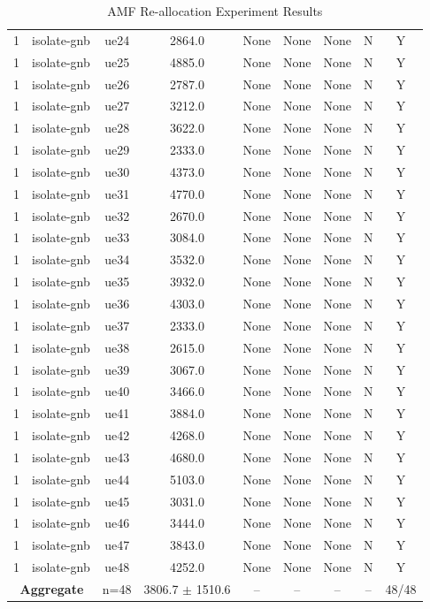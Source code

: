 \begin{table}[ht]
\begin{tabular}{|c|c|c|c|c|c|c|c|c|}
1 & isolate-gnb & ue24 & 2864.0 & None & None & None & N & Y \\
1 & isolate-gnb & ue25 & 4885.0 & None & None & None & N & Y \\
1 & isolate-gnb & ue26 & 2787.0 & None & None & None & N & Y \\
1 & isolate-gnb & ue27 & 3212.0 & None & None & None & N & Y \\
1 & isolate-gnb & ue28 & 3622.0 & None & None & None & N & Y \\
1 & isolate-gnb & ue29 & 2333.0 & None & None & None & N & Y \\
1 & isolate-gnb & ue30 & 4373.0 & None & None & None & N & Y \\
1 & isolate-gnb & ue31 & 4770.0 & None & None & None & N & Y \\
1 & isolate-gnb & ue32 & 2670.0 & None & None & None & N & Y \\
1 & isolate-gnb & ue33 & 3084.0 & None & None & None & N & Y \\
1 & isolate-gnb & ue34 & 3532.0 & None & None & None & N & Y \\
1 & isolate-gnb & ue35 & 3932.0 & None & None & None & N & Y \\
1 & isolate-gnb & ue36 & 4303.0 & None & None & None & N & Y \\
1 & isolate-gnb & ue37 & 2333.0 & None & None & None & N & Y \\
1 & isolate-gnb & ue38 & 2615.0 & None & None & None & N & Y \\
1 & isolate-gnb & ue39 & 3067.0 & None & None & None & N & Y \\
1 & isolate-gnb & ue40 & 3466.0 & None & None & None & N & Y \\
1 & isolate-gnb & ue41 & 3884.0 & None & None & None & N & Y \\
1 & isolate-gnb & ue42 & 4268.0 & None & None & None & N & Y \\
1 & isolate-gnb & ue43 & 4680.0 & None & None & None & N & Y \\
1 & isolate-gnb & ue44 & 5103.0 & None & None & None & N & Y \\
1 & isolate-gnb & ue45 & 3031.0 & None & None & None & N & Y \\
1 & isolate-gnb & ue46 & 3444.0 & None & None & None & N & Y \\
1 & isolate-gnb & ue47 & 3843.0 & None & None & None & N & Y \\
1 & isolate-gnb & ue48 & 4252.0 & None & None & None & N & Y \\
\multicolumn{2}{|c|}{\textbf{Aggregate}} & n=48 & 3806.7 $\pm$ 1510.6 & -- & -- & -- & -- & 48/48 \\
\hline
\end{tabular}
\caption{AMF Re-allocation Experiment Results}
\label{tab:amf_realloc}
\end{table}
